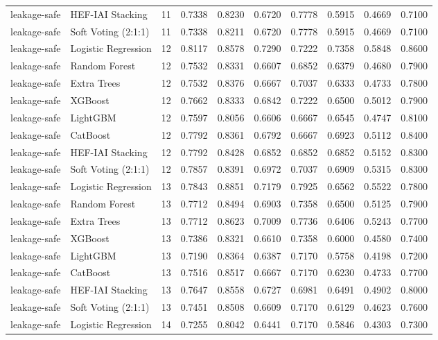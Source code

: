 \begin{tabular}{llrrrrrrrr}
leakage-safe & HEF-IAI Stacking & 11 & 0.7338 & 0.8230 & 0.6720 & 0.7778 & 0.5915 & 0.4669 & 0.7100 \\
leakage-safe & Soft Voting (2:1:1) & 11 & 0.7338 & 0.8211 & 0.6720 & 0.7778 & 0.5915 & 0.4669 & 0.7100 \\
leakage-safe & Logistic Regression & 12 & 0.8117 & 0.8578 & 0.7290 & 0.7222 & 0.7358 & 0.5848 & 0.8600 \\
leakage-safe & Random Forest & 12 & 0.7532 & 0.8331 & 0.6607 & 0.6852 & 0.6379 & 0.4680 & 0.7900 \\
leakage-safe & Extra Trees & 12 & 0.7532 & 0.8376 & 0.6667 & 0.7037 & 0.6333 & 0.4733 & 0.7800 \\
leakage-safe & XGBoost & 12 & 0.7662 & 0.8333 & 0.6842 & 0.7222 & 0.6500 & 0.5012 & 0.7900 \\
leakage-safe & LightGBM & 12 & 0.7597 & 0.8056 & 0.6606 & 0.6667 & 0.6545 & 0.4747 & 0.8100 \\
leakage-safe & CatBoost & 12 & 0.7792 & 0.8361 & 0.6792 & 0.6667 & 0.6923 & 0.5112 & 0.8400 \\
leakage-safe & HEF-IAI Stacking & 12 & 0.7792 & 0.8428 & 0.6852 & 0.6852 & 0.6852 & 0.5152 & 0.8300 \\
leakage-safe & Soft Voting (2:1:1) & 12 & 0.7857 & 0.8391 & 0.6972 & 0.7037 & 0.6909 & 0.5315 & 0.8300 \\
leakage-safe & Logistic Regression & 13 & 0.7843 & 0.8851 & 0.7179 & 0.7925 & 0.6562 & 0.5522 & 0.7800 \\
leakage-safe & Random Forest & 13 & 0.7712 & 0.8494 & 0.6903 & 0.7358 & 0.6500 & 0.5125 & 0.7900 \\
leakage-safe & Extra Trees & 13 & 0.7712 & 0.8623 & 0.7009 & 0.7736 & 0.6406 & 0.5243 & 0.7700 \\
leakage-safe & XGBoost & 13 & 0.7386 & 0.8321 & 0.6610 & 0.7358 & 0.6000 & 0.4580 & 0.7400 \\
leakage-safe & LightGBM & 13 & 0.7190 & 0.8364 & 0.6387 & 0.7170 & 0.5758 & 0.4198 & 0.7200 \\
leakage-safe & CatBoost & 13 & 0.7516 & 0.8517 & 0.6667 & 0.7170 & 0.6230 & 0.4733 & 0.7700 \\
leakage-safe & HEF-IAI Stacking & 13 & 0.7647 & 0.8558 & 0.6727 & 0.6981 & 0.6491 & 0.4902 & 0.8000 \\
leakage-safe & Soft Voting (2:1:1) & 13 & 0.7451 & 0.8508 & 0.6609 & 0.7170 & 0.6129 & 0.4623 & 0.7600 \\
leakage-safe & Logistic Regression & 14 & 0.7255 & 0.8042 & 0.6441 & 0.7170 & 0.5846 & 0.4303 & 0.7300 \\

\end{tabular}
